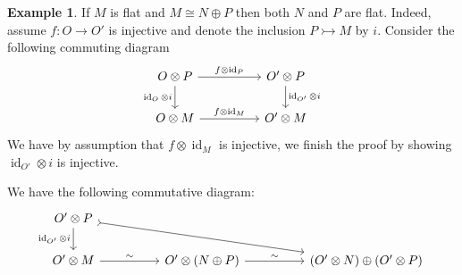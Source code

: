 \documentclass[12pt]{article}
\theoremstyle{plain}
\theoremstyle{definition}
\newtheorem{example}[thm]{Example}
\newcommand{\lto}{\longrightarrow}
\begin{document}
\begin{example}
If $M$ is flat and $M \cong N \oplus P$ then both $N$ and $P$ are flat. Indeed, assume $f: O \lto O'$ is injective and denote the inclusion $P \rightarrowtail M$ by $i$. Consider the following commuting diagram
\begin{equation}
\begin{tikzcd}[column sep = huge]
O \otimes P\arrow[r,"{f \otimes \operatorname{id}_P}"]\arrow[d,swap,"{\operatorname{id}_O \otimes i}"] & O' \otimes P\arrow[d,"{\operatorname{id}_{O'} \otimes i}"]\\
O \otimes M\arrow[r,"{f \otimes \operatorname{id}_M}"] & O' \otimes M
\end{tikzcd}
\end{equation}
We have by assumption that $f \otimes \operatorname{id}_M$ is injective, we finish the proof by showing $\operatorname{id}_{O'} \otimes i$ is injective. 

We have the following commutative diagram:
\begin{equation}
\begin{tikzcd}[column sep = huge]
O' \otimes P\arrow[rrd,rightarrowtail]\arrow[d,swap,"{\operatorname{id}_{O'} \otimes i}"]\\
O' \otimes M\arrow[r,"\sim"] & O' \otimes (N \oplus P)\arrow[r,"{\sim}"] & (O' \otimes N) \oplus (O' \otimes P)
\end{tikzcd}
\end{equation}
\end{example}
\end{document}

